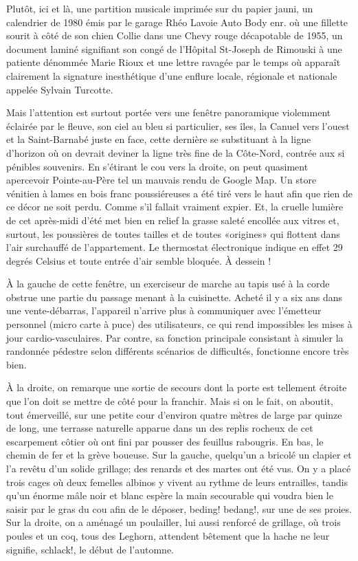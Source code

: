 Plutôt, ici et là, une partition musicale imprimée sur du papier jauni, un calendrier de 1980 émis par le garage Rhéo Lavoie Auto Body enr. où une fillette sourit à côté de son chien Collie dans une Chevy rouge décapotable de 1955, un document laminé signifiant son congé de l’Hôpital St-Joseph de Rimouski à une patiente dénommée Marie Rioux et une lettre ravagée par le temps où apparaît clairement la signature inesthétique d’une enflure locale, régionale et nationale appelée Sylvain Turcotte.

Mais l’attention est surtout portée vers une fenêtre panoramique violemment éclairée par le fleuve, son ciel au bleu si particulier, ses îles, la Canuel vers l’ouest et la Saint-Barnabé juste en face, cette dernière se substituant à la ligne d’horizon où on devrait deviner la ligne très fine de la Côte-Nord, contrée aux si pénibles souvenirs. En s’étirant le cou vers la droite, on peut quasiment apercevoir Pointe-au-Père tel un mauvais rendu de Google Map. Un store vénitien à lames en bois franc poussiéreuses a été tiré vers le haut afin que rien de ce décor ne soit perdu. Comme s’il fallait vraiment expier. Et, la cruelle lumière de cet après-midi d’été met bien en relief la grasse saleté encollée aux vitres et, surtout, les poussières de toutes tailles et de toutes «origines» qui flottent dans l’air surchauffé de l’appartement. Le thermostat électronique indique en effet 29 degrés Celsius et toute entrée d’air semble bloquée. À dessein !

À la gauche de cette fenêtre, un exerciseur de marche au tapis usé à la corde obstrue une partie du passage menant à la cuisinette. Acheté il y a six ans dans une vente-débarras, l’appareil n’arrive plus à communiquer avec l’émetteur personnel (micro carte à puce) des utilisateurs, ce qui rend impossibles les mises à jour cardio-vasculaires. Par contre, sa fonction principale consistant à simuler la randonnée pédestre selon différents scénarios de difficultés, fonctionne encore très bien.

À la droite, on remarque une sortie de secours dont la porte est tellement étroite que l’on doit se mettre de côté pour la franchir. Mais si on le fait, on aboutit, tout émerveillé, sur une petite cour d’environ quatre mètres de large par quinze de long, une terrasse naturelle apparue dans un des replis rocheux de cet escarpement côtier où ont fini par pousser des feuillus rabougris. En bas, le chemin de fer et la grève boueuse. Sur la gauche, quelqu’un a bricolé un clapier et l’a revêtu d’un solide grillage; des renards et des martes ont été vus. On y a placé trois cages où deux femelles albinos y vivent au rythme de leurs entrailles, tandis qu’un énorme mâle noir et blanc espère la main secourable qui voudra bien le saisir par le gras du cou afin de le déposer, beding! bedang!, sur une de ses proies. Sur la droite, on a aménagé un poulailler, lui aussi renforcé de grillage, où trois poules et un coq, tous des Leghorn, attendent bêtement que la hache ne leur signifie, schlack!, le début de l’automne.

